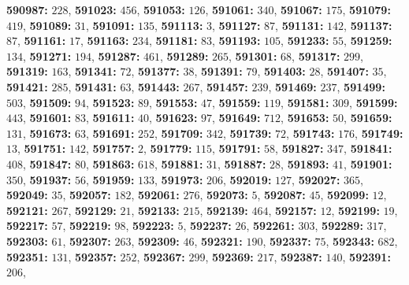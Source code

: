 \textsf{\bfseries 590987:} $228$, \textsf{\bfseries 591023:} $456$, \textsf{\bfseries 591053:} $126$, \textsf{\bfseries 591061:} $340$, \textsf{\bfseries 591067:} $175$, \textsf{\bfseries 591079:} $419$, \textsf{\bfseries 591089:} $31$, \textsf{\bfseries 591091:} $135$, \textsf{\bfseries 591113:} $3$, \textsf{\bfseries 591127:} $87$, \textsf{\bfseries 591131:} $142$, \textsf{\bfseries 591137:} $87$, \textsf{\bfseries 591161:} $17$, \textsf{\bfseries 591163:} $234$, \textsf{\bfseries 591181:} $83$, \textsf{\bfseries 591193:} $105$, \textsf{\bfseries 591233:} $55$, \textsf{\bfseries 591259:} $134$, \textsf{\bfseries 591271:} $194$, \textsf{\bfseries 591287:} $461$, \textsf{\bfseries 591289:} $265$, \textsf{\bfseries 591301:} $68$, \textsf{\bfseries 591317:} $299$, \textsf{\bfseries 591319:} $163$, \textsf{\bfseries 591341:} $72$, \textsf{\bfseries 591377:} $38$, \textsf{\bfseries 591391:} $79$, \textsf{\bfseries 591403:} $28$, \textsf{\bfseries 591407:} $35$, \textsf{\bfseries 591421:} $285$, \textsf{\bfseries 591431:} $63$, \textsf{\bfseries 591443:} $267$, \textsf{\bfseries 591457:} $239$, \textsf{\bfseries 591469:} $237$, \textsf{\bfseries 591499:} $503$, \textsf{\bfseries 591509:} $94$, \textsf{\bfseries 591523:} $89$, \textsf{\bfseries 591553:} $47$, \textsf{\bfseries 591559:} $119$, \textsf{\bfseries 591581:} $309$, \textsf{\bfseries 591599:} $443$, \textsf{\bfseries 591601:} $83$, \textsf{\bfseries 591611:} $40$, \textsf{\bfseries 591623:} $97$, \textsf{\bfseries 591649:} $712$, \textsf{\bfseries 591653:} $50$, \textsf{\bfseries 591659:} $131$, \textsf{\bfseries 591673:} $63$, \textsf{\bfseries 591691:} $252$, \textsf{\bfseries 591709:} $342$, \textsf{\bfseries 591739:} $72$, \textsf{\bfseries 591743:} $176$, \textsf{\bfseries 591749:} $13$, \textsf{\bfseries 591751:} $142$, \textsf{\bfseries 591757:} $2$, \textsf{\bfseries 591779:} $115$, \textsf{\bfseries 591791:} $58$, \textsf{\bfseries 591827:} $347$, \textsf{\bfseries 591841:} $408$, \textsf{\bfseries 591847:} $80$, \textsf{\bfseries 591863:} $618$, \textsf{\bfseries 591881:} $31$, \textsf{\bfseries 591887:} $28$, \textsf{\bfseries 591893:} $41$, \textsf{\bfseries 591901:} $350$, \textsf{\bfseries 591937:} $56$, \textsf{\bfseries 591959:} $133$, \textsf{\bfseries 591973:} $206$, \textsf{\bfseries 592019:} $127$, \textsf{\bfseries 592027:} $365$, \textsf{\bfseries 592049:} $35$, \textsf{\bfseries 592057:} $182$, \textsf{\bfseries 592061:} $276$, \textsf{\bfseries 592073:} $5$, \textsf{\bfseries 592087:} $45$, \textsf{\bfseries 592099:} $12$, \textsf{\bfseries 592121:} $267$, \textsf{\bfseries 592129:} $21$, \textsf{\bfseries 592133:} $215$, \textsf{\bfseries 592139:} $464$, \textsf{\bfseries 592157:} $12$, \textsf{\bfseries 592199:} $19$, \textsf{\bfseries 592217:} $57$, \textsf{\bfseries 592219:} $98$, \textsf{\bfseries 592223:} $5$, \textsf{\bfseries 592237:} $26$, \textsf{\bfseries 592261:} $303$, \textsf{\bfseries 592289:} $317$, \textsf{\bfseries 592303:} $61$, \textsf{\bfseries 592307:} $263$, \textsf{\bfseries 592309:} $46$, \textsf{\bfseries 592321:} $190$, \textsf{\bfseries 592337:} $75$, \textsf{\bfseries 592343:} $682$, \textsf{\bfseries 592351:} $131$, \textsf{\bfseries 592357:} $252$, \textsf{\bfseries 592367:} $299$, \textsf{\bfseries 592369:} $217$, \textsf{\bfseries 592387:} $140$, \textsf{\bfseries 592391:} $206$, 
